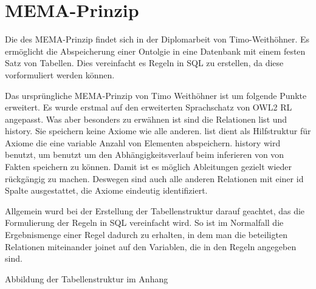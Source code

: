 \section{MEMA-Prinzip}
Die des MEMA-Prinzip findet sich in der Diplomarbeit von Timo-Weithöhner. Es ermöglicht die Abspeicherung einer Ontolgie in eine Datenbank mit einem festen Satz von Tabellen. Dies vereinfacht es Regeln in SQL zu erstellen, da diese vorformuliert werden können.

Das ursprüngliche MEMA-Prinzip von Timo Weithöhner ist um folgende Punkte erweitert.
Es wurde erstmal auf den erweiterten Sprachschatz von OWL2 RL angepasst. Was aber besonders zu erwähnen ist sind die Relationen list und history. Sie speichern keine Axiome wie alle anderen. list dient als Hilfstruktur für Axiome die eine variable Anzahl von Elementen abspeichern. history wird benutzt, um benutzt um den Abhängigkeitsverlauf beim inferieren von von Fakten speichern zu können. Damit ist es möglich Ableitungen gezielt wieder rückgängig zu machen. Deswegen sind auch alle anderen Relationen mit einer id Spalte ausgestattet, die Axiome eindeutig identifiziert.

Allgemein wurd bei der Erstellung der Tabellenstruktur darauf geachtet, das die Formulierung der Regeln in SQL vereinfacht wird. So ist im Normalfall die Ergebnismenge einer Regel dadurch zu erhalten, in dem man die beteiligten Relationen miteinander joinet auf den Variablen, die in den Regeln angegeben sind.

Abbildung der Tabellenstruktur im Anhang
